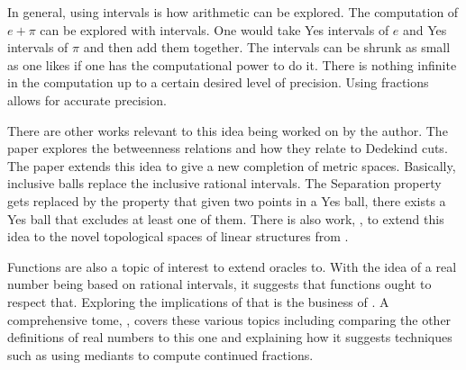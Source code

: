 \documentclass[12pt]{article}
\begin{document}
In general, using intervals is how arithmetic can be explored. The computation of $e + \pi$ can be explored with intervals. One would take Yes intervals of $e$ and Yes intervals of $\pi$ and then add them together. The intervals can be shrunk as small as one likes if one has the computational power to do it. There is nothing infinite in the computation up to a certain desired level of precision. Using fractions allows for accurate precision. 

There are other works relevant to this idea being worked on by the author. The paper \cite{taylor24dedekind} explores the betweenness relations and how they relate to Dedekind cuts. The paper \cite{taylor23metric} extends this idea to give a new completion of metric spaces. Basically, inclusive balls replace the inclusive rational intervals. The Separation property gets replaced by the property that given two points in a Yes ball, there exists a Yes ball that excludes at least one of them. There is also work, \cite{taylor23maudlin}, to extend this idea to the novel topological spaces of linear structures from \cite{maudlin}. 

Functions are also a topic of interest to extend oracles to. With the idea of a real number being based on rational intervals, it suggests that functions ought to respect that. Exploring the implications of that is the business of \cite{taylor23funora}. A comprehensive tome, \cite{taylor23main}, covers these various topics including comparing the other definitions of real numbers to this one and explaining how it suggests techniques such as using mediants to compute continued fractions. 

\medskip

\normalem %

\printbibliography
\end{document}

